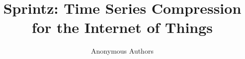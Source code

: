 \documentclass[acmlarge]{acmart}
\begin{document}



\title{Sprintz: Time Series Compression for the Internet of Things}






\author{Anonymous Authors}

\end{document}
